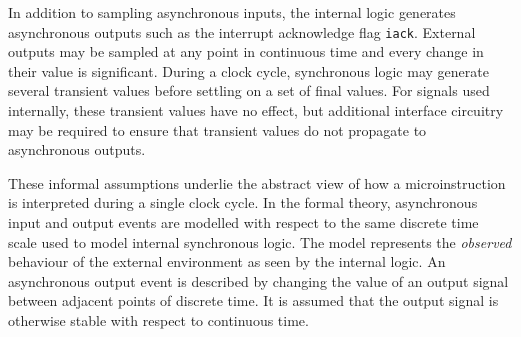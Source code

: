 In addition to sampling asynchronous inputs,
the internal logic generates asynchronous outputs such as the
interrupt acknowledge flag \verb"iack".
External outputs may be sampled at any point in continuous time
and every change in their value is significant.
During a clock cycle,
synchronous logic may generate several transient values
before settling on a set of final values.
For signals used internally,
these transient values have no effect,
but additional interface circuitry may be
required to ensure that transient values do not
propagate to asynchronous outputs.

These
informal assumptions underlie the abstract view
of how a microinstruction is interpreted during a single clock cycle.
In the formal theory,
asynchronous input and output events are
modelled with respect to the same discrete time scale
used to model internal synchronous logic.
The model represents the {\it observed}
behaviour of the external environment
as seen by the internal logic.
An asynchronous output event is described by
changing the value of an output signal between adjacent
points of discrete time.
It is assumed that the output signal is
otherwise stable with respect to continuous time.
